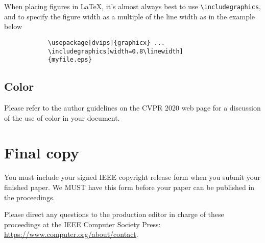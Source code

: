 \documentclass[10pt,twocolumn,letterpaper]{article}
\begin{document}
	When placing figures in \LaTeX, it's almost always best to use
	\verb+\includegraphics+, and to specify the  figure width as a multiple of
	the line width as in the example below
	{\small\begin{verbatim}
			\usepackage[dvips]{graphicx} ...
			\includegraphics[width=0.8\linewidth]
			{myfile.eps}
		\end{verbatim}
	}
	
	
	\subsection{Color}
	
	Please refer to the author guidelines on the CVPR 2020 web page for a discussion
	of the use of color in your document.
	
	\section{Final copy}
	
	You must include your signed IEEE copyright release form when you submit
	your finished paper. We MUST have this form before your paper can be
	published in the proceedings.
	
	Please direct any questions to the production editor in charge of these 
	proceedings at the IEEE Computer Society Press: 
	\url{https://www.computer.org/about/contact}. 
	
	
	{\small
		
		
	}
	
\end{document}
